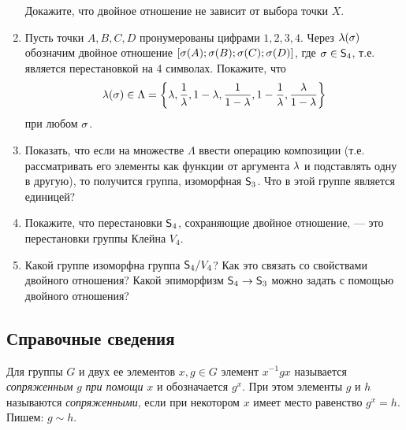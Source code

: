 \begin{enumerate}
Докажите, что двойное отношение не зависит от выбора точки $X$.

\item Пусть точки $A,B,C,D$ пронумерованы цифрами $1,2,3,4$. Через $\lambda(\sigma)$ обозначим двойное отношение $[\sigma(A);\sigma(B);\sigma(C);\sigma(D)]$, где $\sigma\in{\mathsf{S}}_4$, т.е. является перестановкой на 4 символах. Покажите, что
$$
\lambda(\sigma) \in \Lambda = \left\{\lambda,\frac{1}{\lambda},1-\lambda,\frac{1}{1-\lambda},1-\frac{1}{\lambda},\frac{\lambda}{1-\lambda}\right\}
$$
при любом $\sigma$.

\item Показать, что если на множестве $\Lambda$ ввести операцию композиции (т.е. рассматривать его элементы как функции от аргумента $\lambda$ и подставлять одну в другую), то получится группа, изоморфная ${\mathsf{S}}_3$. Что в этой группе является единицей?

\item Покажите, что перестановки ${\mathsf{S}}_4$, сохраняющие двойное отношение, --- это перестановки группы Клейна $V_4$.

\item Какой группе изоморфна группа ${\mathsf{S}}_4/V_4$? Как это связать со свойствами двойного отношения? Какой эпиморфизм ${\mathsf{S}}_4\to{\mathsf{S}}_3$ можно задать с помощью двойного отношения?

\end{enumerate}

\subsection*{Справочные сведения}

Для группы $G$ и двух ее элементов $x,g\in G$ элемент $x^{-1}gx$ называется \textit{сопряженным} $g$ \textit{при помощи} $x$ и обозначается $g^x$. При этом элементы $g$ и $h$ называются \textit{сопряженными}, если при некотором $x$ имеет место равенство $g^x=h$. Пишем: $g\sim h$.

